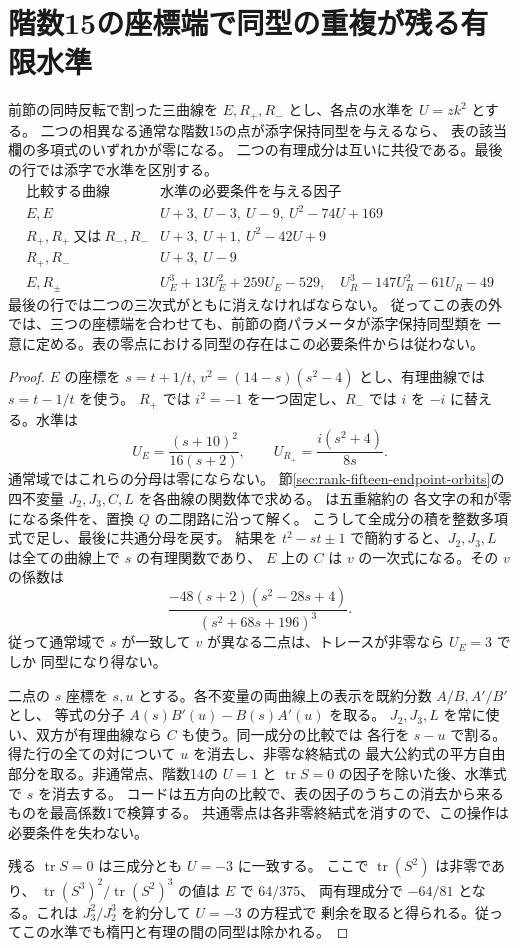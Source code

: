 \section{階数15の座標端で同型の重複が残る有限水準}
\label{sec:rank-fifteen-coordinate-collisions}
\begin{theorem}\label{thm:rank-fifteen-coordinate-collisions}
前節の同時反転で割った三曲線を $E,R_+,R_-$ とし、各点の水準を $U=zk^2$ とする。
二つの相異なる通常な階数15の点が添字保持同型を与えるなら、
表の該当欄の多項式のいずれかが零になる。
二つの有理成分は互いに共役である。最後の行では添字で水準を区別する。
\[
\begin{array}{c|l}
\text{比較する曲線} & \text{水準の必要条件を与える因子} \\\hline
 E,E & U+3,\ U-3,\ U-9,\ U^2-74U+169\\
 R_+,R_+\ \text{又は}\ R_-,R_- & U+3,\ U+1,\ U^2-42U+9\\
 R_+,R_- & U+3,\ U-9\\
 E,R_\pm &
 U_E^3+13U_E^2+259U_E-529,\quad U_R^3-147U_R^2-61U_R-49
\end{array}
\]
最後の行では二つの三次式がともに消えなければならない。
従ってこの表の外では、三つの座標端を合わせても、前節の商パラメータが添字保持同型類を
一意に定める。表の零点における同型の存在はこの必要条件からは従わない。
\end{theorem}
\begin{proof}
$E$ の座標を $s=t+1/t$, $v^2=(14-s)(s^2-4)$ とし、有理曲線では $s=t-1/t$ を使う。
$R_+$ では $i^2=-1$ を一つ固定し、$R_-$ では $i$ を $-i$ に替える。水準は
\[
 U_E=\frac{(s+10)^2}{16(s+2)},\qquad
 U_{R_+}=\frac{i(s^2+4)}{8s}.
\]
通常域ではこれらの分母は零にならない。
節\ref{sec:rank-fifteen-endpoint-orbits}の四不変量 $J_2,J_3,C,L$ を各曲線の関数体で求める。
 は五重縮約の
各文字の和が零になる条件を、置換 $Q$ の二閉路に沿って解く。
こうして全成分の積を整数多項式で足し、最後に共通分母を戻す。
結果を $t^2-st\pm1$ で簡約すると、$J_2,J_3,L$ は全ての曲線上で $s$ の有理関数であり、
$E$ 上の $C$ は $v$ の一次式になる。その $v$ の係数は
\[
 \frac{-48(s+2)(s^2-28s+4)}{(s^2+68s+196)^3}.
\]
従って通常域で $s$ が一致して $v$ が異なる二点は、トレースが非零なら $U_E=3$ でしか
同型になり得ない。

二点の $s$ 座標を $s,u$ とする。各不変量の両曲線上の表示を既約分数 $A/B,A'/B'$ とし、
等式の分子 $A(s)B'(u)-B(s)A'(u)$ を取る。
$J_2,J_3,L$ を常に使い、双方が有理曲線なら $C$ も使う。同一成分の比較では
各行を $s-u$ で割る。得た行の全ての対について $u$ を消去し、非零な終結式の
最大公約式の平方自由部分を取る。非通常点、階数14の $U=1$ と
$\operatorname{tr}S=0$ の因子を除いた後、水準式で $s$ を消去する。
コードは五方向の比較で、表の因子のうちこの消去から来るものを最高係数1で検算する。
共通零点は各非零終結式を消すので、この操作は必要条件を失わない。

残る $\operatorname{tr}S=0$ は三成分とも $U=-3$ に一致する。
ここで $\operatorname{tr}(S^2)$ は非零であり、
$\operatorname{tr}(S^3)^2/\operatorname{tr}(S^2)^3$ の値は $E$ で $64/375$、
両有理成分で $-64/81$ となる。これは $J_3^2/J_2^3$ を約分して $U=-3$ の方程式で
剰余を取ると得られる。従ってこの水準でも楕円と有理の間の同型は除かれる。
\end{proof}
